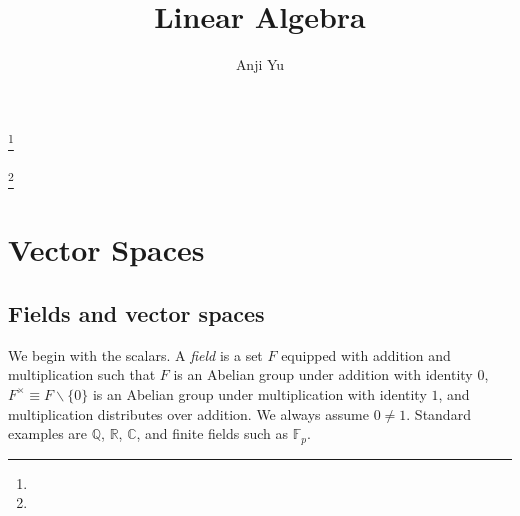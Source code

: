 \documentclass{amsbook}
\theoremstyle{definition}
\theoremstyle{remark}
\newcommand{\Fp}{\mathbb{F}_p}
\newcommand{\Q}{\mathbb{Q}}
\newcommand{\R}{\mathbb{R}}
\numberwithin{section}{chapter}
\numberwithin{equation}{chapter}
\begin{document}
\frontmatter

\title{Linear Algebra}


\author{Anji Yu}
\address{}
\curraddr{}
\email{}
\thanks{}

\author{}
\address{}
\curraddr{}
\email{}
\thanks{}


\keywords{}

\date{}

\begin{abstract}
\end{abstract}

\maketitle


\setcounter{page}{4}

\tableofcontents



\mainmatter
\chapter{Vector Spaces}

\section{Fields and vector spaces}

We begin with the scalars. A \emph{field} is a set $F$ equipped with addition and multiplication such that $F$ is an Abelian group under addition with identity $0$, $F^\times\equiv F\backslash\{0\}$ is an Abelian group under multiplication with identity $1$, and multiplication distributes over addition. We always assume $0\neq 1$. Standard examples are $\Q$, $\R$, $\mathbb{C}$, and finite fields such as $\Fp$.
\end{document}
